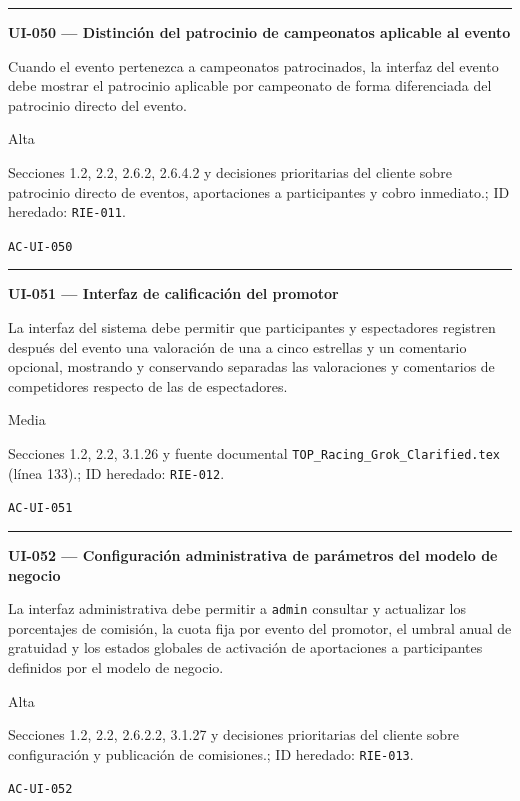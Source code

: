 \documentclass[10pt,letterpaper]{article}
\begin{document}
\vspace{0.25em}\hrule\vspace{0.65em}
\noindent\textbf{UI-050 --- Distinción del patrocinio de campeonatos aplicable al evento}\par
\begin{description}[style=nextline,leftmargin=3.15cm,labelwidth=2.8cm,font=\normalfont\bfseries]
\item[Obligación] Cuando el evento pertenezca a campeonatos patrocinados, la interfaz del evento debe mostrar el patrocinio aplicable por campeonato de forma diferenciada del patrocinio directo del evento.
\item[Prioridad] Alta
\item[Procedencia] Secciones 1.2, 2.2, 2.6.2, 2.6.4.2 y decisiones prioritarias del cliente sobre patrocinio directo de eventos, aportaciones a participantes y cobro inmediato.; ID heredado: \texttt{RIE-011}.
\item[Verificación] \texttt{AC-UI-050}
\end{description}
\vspace{0.25em}\hrule\vspace{0.65em}
\noindent\textbf{UI-051 --- Interfaz de calificación del promotor}\par
\begin{description}[style=nextline,leftmargin=3.15cm,labelwidth=2.8cm,font=\normalfont\bfseries]
\item[Obligación] La interfaz del sistema debe permitir que participantes y espectadores registren después del evento una valoración de una a cinco estrellas y un comentario opcional, mostrando y conservando separadas las valoraciones y comentarios de competidores respecto de las de espectadores.
\item[Prioridad] Media
\item[Procedencia] Secciones 1.2, 2.2, 3.1.26 y fuente documental \texttt{TOP\_Racing\_Grok\_Clarified.tex} (línea 133).; ID heredado: \texttt{RIE-012}.
\item[Verificación] \texttt{AC-UI-051}
\end{description}
\vspace{0.25em}\hrule\vspace{0.65em}
\noindent\textbf{UI-052 --- Configuración administrativa de parámetros del modelo de negocio}\par
\begin{description}[style=nextline,leftmargin=3.15cm,labelwidth=2.8cm,font=\normalfont\bfseries]
\item[Obligación] La interfaz administrativa debe permitir a \texttt{admin} consultar y actualizar los porcentajes de comisión, la cuota fija por evento del promotor, el umbral anual de gratuidad y los estados globales de activación de aportaciones a participantes definidos por el modelo de negocio.
\item[Prioridad] Alta
\item[Procedencia] Secciones 1.2, 2.2, 2.6.2.2, 3.1.27 y decisiones prioritarias del cliente sobre configuración y publicación de comisiones.; ID heredado: \texttt{RIE-013}.
\item[Verificación] \texttt{AC-UI-052}
\end{description}
\end{document}
